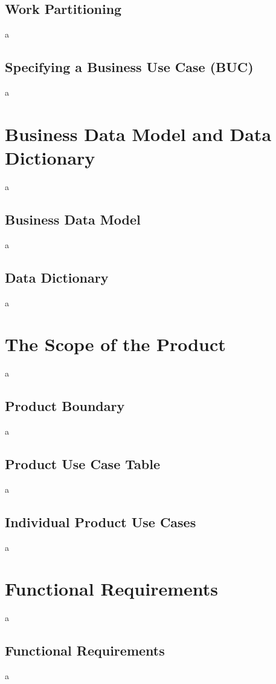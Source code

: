 \documentclass[12pt]{article}
\begin{document}
\subsection{Work Partitioning}
a

\subsection{Specifying a Business Use Case (BUC)}
a

\section{Business Data Model and Data Dictionary}
a

\subsection{Business Data Model}
a

\subsection{Data Dictionary}
a

\section{The Scope of the Product}
a

\subsection{Product Boundary}
a

\subsection{Product Use Case Table}
a

\subsection{Individual Product Use Cases}
a

\section{Functional Requirements}
a

\subsection{Functional Requirements}
a
\end{document}

